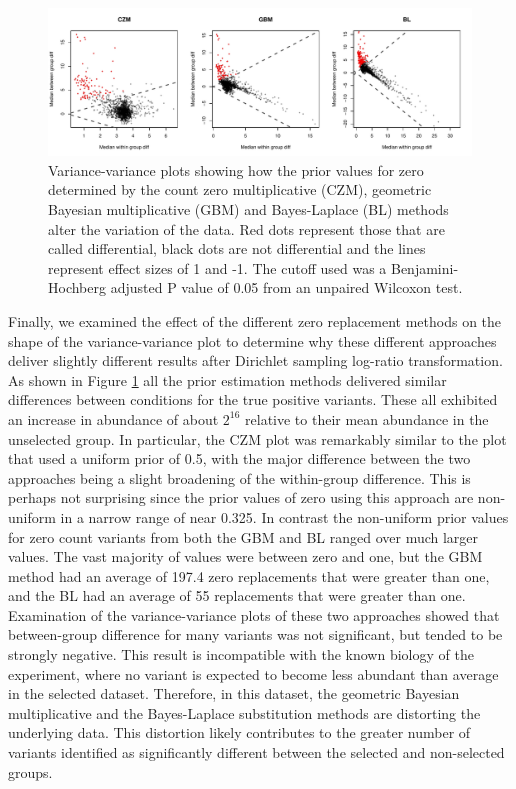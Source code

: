\documentclass[article]{ajs}\usepackage[]{graphicx}\usepackage[]{color}
\begin{document}
\begin{figure}[1ht]
\centerline{\includegraphics[width=5.5in]{figs/zero_replace.pdf}}
\vspace{3mm} \caption{Variance-variance  plots showing how the prior values for zero determined by the count zero multiplicative (CZM), geometric Bayesian multiplicative (GBM) and Bayes-Laplace (BL) methods alter the variation of the data. Red dots represent those that are called differential, black dots are not differential and the lines represent effect sizes of 1 and -1. The cutoff used was a Benjamini-Hochberg adjusted P value of 0.05 from an unpaired Wilcoxon test.  }
\label{fig:replace}
\end{figure}

Finally, we examined the effect of the different zero replacement methods on the shape of the variance-variance plot to determine why these different approaches deliver slightly different results after Dirichlet sampling log-ratio transformation. As shown in Figure \ref{fig:replace} all the prior estimation methods delivered similar differences between conditions for the true positive variants. These all exhibited an increase in abundance of about $2^{16}$ relative to their mean abundance in the unselected group. In particular, the CZM plot was remarkably similar  to the plot that used a uniform prior of 0.5, with the major difference between the two approaches being a slight broadening of the within-group difference. This is perhaps not surprising since the prior values of zero using this approach are non-uniform in a narrow range of near 0.325. In contrast the non-uniform prior values for zero count variants from both the GBM and BL ranged over much larger values. The vast majority of values were between zero and one, but the GBM method had an average of 197.4 zero replacements that were greater than one, and the BL had an average of 55 replacements that were greater than one. Examination of the variance-variance plots of these two approaches showed that between-group difference for many variants was not significant, but tended to be strongly negative. This result is incompatible with the known biology of the experiment, where no variant is expected to become less abundant than average in the selected dataset. Therefore, in this dataset, the geometric Bayesian multiplicative and the Bayes-Laplace substitution methods are distorting the underlying data. This distortion likely contributes to the greater number of variants identified as significantly different between the selected and non-selected groups.  
\end{document}
